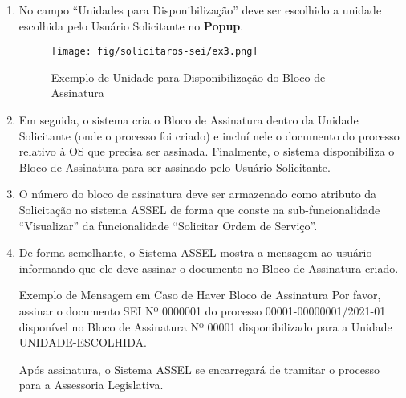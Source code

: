 \begin{enumerate}
	
	
	\item No campo ``Unidades para Disponibilização'' deve ser escolhido a unidade escolhida pelo Usuário Solicitante no \textbf{Popup}.

    \begin{figure}[htbp!]
	\centering
	\texttt{[image: fig/solicitaros-sei/ex3.png]}
	\caption{Exemplo de Unidade para Disponibilização do Bloco de Assinatura}
	\label{fig:solitaros-sei:ex3}
	\end{figure}


	\item Em seguida, o sistema cria o Bloco de Assinatura dentro da Unidade Solicitante (onde o processo foi criado) e incluí nele o documento do processo relativo à OS que precisa ser assinada. Finalmente, o sistema disponibiliza o Bloco de Assinatura para ser assinado pelo Usuário Solicitante.

	\item O número do bloco de assinatura deve ser armazenado como atributo da Solicitação no sistema ASSEL de forma que conste na sub-funcionalidade ``Visualizar'' da funcionalidade ``Solicitar Ordem de Serviço''. 

	\item De forma semelhante, o Sistema ASSEL mostra a mensagem ao usuário informando que ele deve assinar o documento no Bloco de Assinatura criado.
	
	
	\begin{exemplo}[1]{Exemplo de Mensagem em Caso de Haver Bloco de Assinatura}
	Por favor, assinar o documento SEI Nº 0000001 do processo 00001-00000001/2021-01 disponível no Bloco de Assinatura Nº 00001 disponibilizado para a Unidade UNIDADE-ESCOLHIDA. 
	
	\vphantom{espaço vertical em branco}			
	
	Após assinatura, o Sistema ASSEL se encarregará de tramitar o processo para a Assessoria Legislativa.

	\vphantom{espaço vertical em branco}	
					
\end{exemplo}	
	
	
	\end{enumerate}	
	


